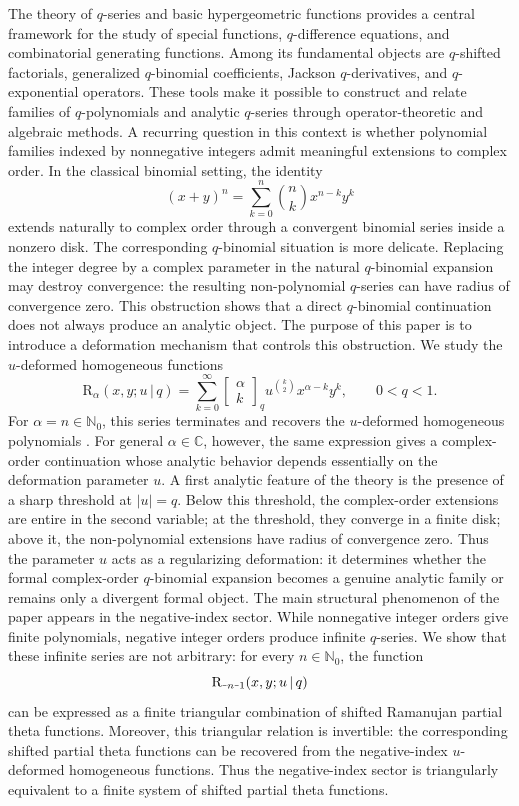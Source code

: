 \documentclass[12pt]{article}
\newcommand{\minus}{\textup{\texttt{-}}}
\newcommand{\rr}{\mathrm{R}}
\begin{document}
The theory of \(q\)-series and basic hypergeometric functions provides a central framework for the study of special functions, \(q\)-difference equations, and combinatorial generating functions. Among its fundamental objects are \(q\)-shifted factorials, generalized \(q\)-binomial coefficients, Jackson \(q\)-derivatives, and \(q\)-exponential operators. These tools make it possible to construct and relate families of \(q\)-polynomials and analytic \(q\)-series through operator-theoretic and algebraic methods. A recurring question in this context is whether polynomial families indexed by nonnegative integers admit meaningful extensions to complex order. In the classical binomial setting, the identity 
\[ 
(x+y)^n = \sum_{k=0}^{n} \binom{n}{k}x^{n-k}y^k 
\] 
extends naturally to complex order through a convergent binomial series inside a nonzero disk. The corresponding \(q\)-binomial situation is more delicate. Replacing the integer degree by a complex parameter in the natural \(q\)-binomial expansion may destroy convergence: the resulting non-polynomial \(q\)-series can have radius of convergence zero. This obstruction shows that a direct \(q\)-binomial continuation does not always produce an analytic object. The purpose of this paper is to introduce a deformation mechanism that controls this obstruction. We study the \(u\)-deformed homogeneous functions 
\[ 
\rr_{\alpha}(x,y;u\,|\,q) = \sum_{k=0}^{\infty} \begin{bmatrix} \alpha\\ k \end{bmatrix}_{q} u^{\binom{k}{2}}x^{\alpha-k}y^k, \qquad 0<q<1. 
\] 
For \(\alpha=n\in\mathbb N_0\), this series terminates and recovers the \(u\)-deformed homogeneous polynomials \cite{orozco}. For general \(\alpha\in\mathbb C\), however, the same expression gives a complex-order continuation whose analytic behavior depends essentially on the deformation parameter \(u\). A first analytic feature of the theory is the presence of a sharp threshold at \(|u|=q\). Below this threshold, the complex-order extensions are entire in the second variable; at the threshold, they converge in a finite disk; above it, the non-polynomial extensions have radius of convergence zero. Thus the parameter \(u\) acts as a regularizing deformation: it determines whether the formal complex-order \(q\)-binomial expansion becomes a genuine analytic family or remains only a divergent formal object. The main structural phenomenon of the paper appears in the negative-index sector. While nonnegative integer orders give finite polynomials, negative integer orders produce infinite \(q\)-series. We show that these infinite series are not arbitrary: for every \(n\in\mathbb N_0\), the function 
\[ 
\rr_{\minus n\minus1}(x,y;u\,|\,q) 
\] 
can be expressed as a finite triangular combination of shifted Ramanujan partial theta functions. Moreover, this triangular relation is invertible: the corresponding shifted partial theta functions can be recovered from the negative-index \(u\)-deformed homogeneous functions. Thus the negative-index sector is triangularly equivalent to a finite system of shifted partial theta functions. 
\end{document}

